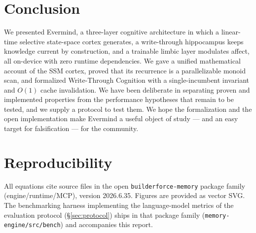 \documentclass[journal,onecolumn,11pt]{IEEEtran}
\begin{document}
\section{Conclusion}
We presented Evermind, a three-layer cognitive architecture in which a linear-time
selective state-space cortex generates, a write-through hippocampus keeps
knowledge current by construction, and a trainable limbic layer modulates affect,
all on-device with zero runtime dependencies. We gave a unified mathematical
account of the SSM cortex, proved that its recurrence is a parallelizable monoid
scan, and formalized Write-Through Cognition with a single-incumbent invariant
and $O(1)$ cache invalidation. We have been deliberate in separating proven and
implemented properties from the performance hypotheses that remain to be tested,
and we supply a protocol to test them. We hope the formalization and the open
implementation make Evermind a useful object of study --- and an easy target for
falsification --- for the community.

\section*{Reproducibility}
All equations cite source files in the open \texttt{builderforce-memory}
package family (engine/runtime/MCP), version 2026.6.35. Figures are provided as
vector SVG. The benchmarking harness implementing the language-model metrics of
the evaluation protocol (\S\ref{sec:protocol}) ships in that package family
(\texttt{memory-engine/src/bench}) and accompanies this report.
\end{document}
